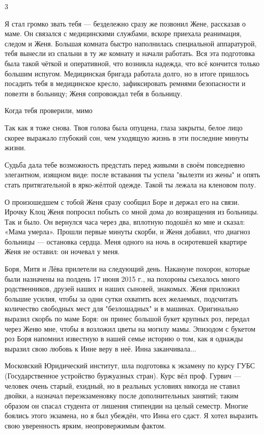 3

Я стал громко звать тебя — бездележно сразу же позвонил Жене, рассказав о маме. Он связался с медицинскими службами, вскоре приехала реанимация, следом и Женя. Большая комната быстро наполнилась специальной аппаратурой, тебя вынесли из спальни в ту же комнату и начали работать. Вся эта подготовка была такой чёткой и оперативной, что возникла надежда, что всё кончится только большим испугом. Медицинская бригада работала долго, но в итоге пришлось посадить тебя в медицинское кресло, зафиксировать ремнями безопасности и повезти в больницу; Женя сопровождал тебя в больницу.

Когда тебя проверили, мимо

Так как я тоже снова. Твоя голова была опущена, глаза закрыты, белое лицо скорее выражало глубокий сон, чем уходящую жизнь в эти последние минуты жизни.

Судьба дала тебе возможность предстать перед живыми в своём повседневно элегантном, изящном виде: после вставания ты успела "вылезти из жены" и опять стать притягательной в ярко-жёлтой одежде. Такой ты лежала на кленовом полу.

О произошедшем с тобой Женя сразу сообщил Боре и держал его на связи. Ирочку Клоц Женя попросил побыть со мной дома до возвращения из больницы. Так и было. Он вернулся часа через два, вплотную подошёл ко мне и сказал: «Мама умерла». Прошли первые минуты скорби, и Женя добавил, что диагноз больницы — остановка сердца. Меня одного на ночь в осиротевшей квартире Женя не оставил: он ночевал у меня.

Боря, Митя и Лёва прилетели на следующий день. Накануне похорон, которые были назначены на полдень 17 июня 2015 г., на похороны съехалось много родственников, друзей наших и наших сыновей, знакомых. Женя приложил большие усилия, чтобы за одни сутки охватить всех желаемых, подсчитать количество свободных мест для "безлошадных" и в машинах. Оригинально выразил скорбь по маме Боря: он принес большой букет крупных роз, передал через Женю мне, чтобы я возложил цветы на могилу мамы. Эпизодом с букетом роз Боря напомнил известную в нашей семье историю о том, как я однажды выразил свою любовь к Инне веру в неё. Инна заканчивала...

Московский Юридический институт, шла подготовка к экзамену по курсу ГУБС (Государственное устройство буржуазных стран). Курс вёл проф. Гурвич — человек очень старый, ехидный, но в реальных условиях никогда не ставил двойки, а назначал переэкзаменовку после дополнительных занятий; таким образом он спасал студента от лишения стипендии на целый семестр. Многие боялись этого экзамена, но я был убеждён, что Инна его сдаст. Я хотел выразить свою уверенность ярким, неопровержимым фактом.

